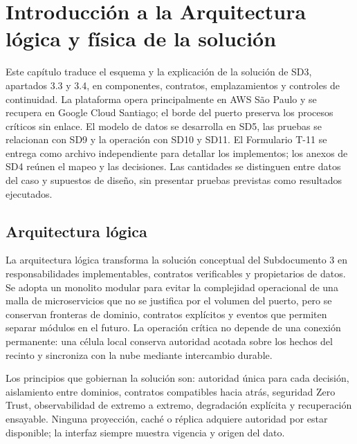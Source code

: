 \documentclass[11pt,letterpaper]{report}
\begin{document}
\tableofcontents
\clearpage
\setcounter{chapter}{3}
\chapter{Introducción a la Arquitectura lógica y física de la solución}

Este capítulo traduce el esquema y la explicación de la solución de SD3, apartados 3.3 y 3.4, en componentes, contratos, emplazamientos y controles de continuidad. La plataforma opera principalmente en AWS São Paulo y se recupera en Google Cloud Santiago; el borde del puerto preserva los procesos críticos sin enlace. El modelo de datos se desarrolla en SD5, las pruebas se relacionan con SD9 y la operación con SD10 y SD11. El Formulario T-11 se entrega como archivo independiente para detallar los implementos; los anexos de SD4 reúnen el mapeo y las decisiones. Las cantidades se distinguen entre datos del caso y supuestos de diseño, sin presentar pruebas previstas como resultados ejecutados.

\section{Arquitectura lógica}

La arquitectura lógica transforma la solución conceptual del Subdocumento 3 en responsabilidades implementables, contratos verificables y propietarios de datos. Se adopta un monolito modular para evitar la complejidad operacional de una malla de microservicios que no se justifica por el volumen del puerto, pero se conservan fronteras de dominio, contratos explícitos y eventos que permiten separar módulos en el futuro. La operación crítica no depende de una conexión permanente: una célula local conserva autoridad acotada sobre los hechos del recinto y sincroniza con la nube mediante intercambio durable.

Los principios que gobiernan la solución son: autoridad única para cada decisión, aislamiento entre dominios, contratos compatibles hacia atrás, seguridad Zero Trust, observabilidad de extremo a extremo, degradación explícita y recuperación ensayable. Ninguna proyección, caché o réplica adquiere autoridad por estar disponible; la interfaz siempre muestra vigencia y origen del dato.
\end{document}
